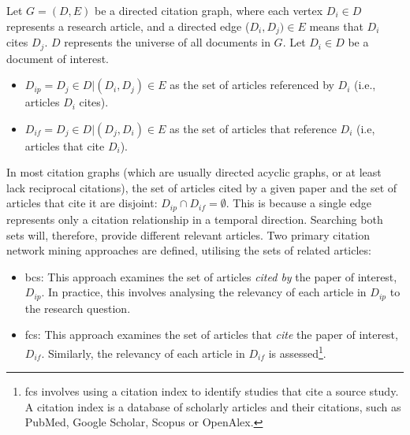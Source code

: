 \documentclass[10pt,oneside]{book}
\begin{document}
\begin{tcolorbox}[title=Citation Network Definitions] 
\small
Let $G = (D, E)$ be a directed citation graph, where each vertex $D_i \in D$ represents a research article, and a directed edge ($D_i, D_j) \in E$ means that $D_i$ cites $D_j$. $D$ represents the universe of all documents in $G$. Let $D_i \in D$ be a document of interest. 

\begin{itemize}
    \item $D_{ip} = {D_j \in D | (D_i, D_j) \in E}$ as the set of articles referenced by $D_i$ (i.e., articles $D_i$ cites). 
    \item $D_{if} = {D_j \in D | (D_j, D_i) \in E}$ as the set of articles that reference $D_i$ (i.e, articles that cite $D_i$).

\end{itemize}

In most citation graphs (which are usually directed acyclic graphs, or at least lack reciprocal citations), the set of articles cited by a given paper and the set of articles that cite it are disjoint: $D_{ip} \cap D_{if} = \emptyset$. This is because a single edge represents only a citation relationship in a temporal direction. Searching both sets will, therefore, provide different relevant articles.
\newline
\newline
Two primary citation network mining approaches are defined, utilising the sets of related articles:

\begin{itemize}
    \item \gls*{bcs}:  This approach examines the set of articles \emph{cited by} the paper of interest, $D_{ip}$.  In practice, this involves analysing the relevancy of each article in $D_{ip}$ to the research question. \cite{lefebvre_cochrane_2011, akers2009systematic}
    \item \gls*{fcs}: This approach examines the set of articles that \emph{cite} the paper of interest, $D_{if}$.  Similarly, the relevancy of each article in $D_{if}$ is assessed\footnote{\gls*{fcs} involves using a citation index to identify studies that cite a source study. A citation index is a database of scholarly articles and their citations, such as PubMed, Google Scholar, Scopus or OpenAlex.}.
\end{itemize}

\end{tcolorbox}
\end{document}

